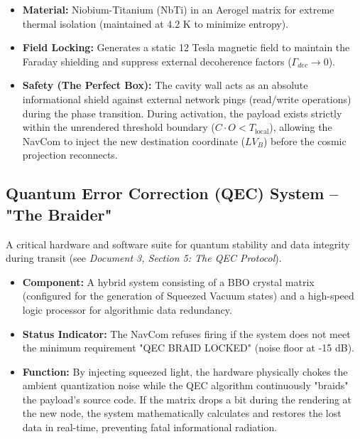 \documentclass[12pt,a4paper]{article}
\begin{document}
\begin{itemize}
    \item \textbf{Material:} Niobium-Titanium (NbTi) in an Aerogel matrix for extreme thermal isolation (maintained at 4.2 K to minimize entropy).
    \item \textbf{Field Locking:} Generates a static 12 Tesla magnetic field to maintain the Faraday shielding and suppress external decoherence factors ($\Gamma_{dec} \rightarrow 0$).
    \item \textbf{Safety (The Perfect Box):} The cavity wall acts as an absolute informational shield against external network pings (read/write operations) during the phase transition. During activation, the payload exists strictly within the unrendered threshold boundary ($C \cdot O < T_{\mathrm{local}}$), allowing the NavCom to inject the new destination coordinate ($LV_B$) before the cosmic projection reconnects.
\end{itemize}


\subsection{Quantum Error Correction (QEC) System -- "The Braider"}
A critical hardware and software suite for quantum stability and data integrity during transit (see \textit{Document 3, Section 5: The QEC Protocol}).
\begin{itemize}
    \item \textbf{Component:} A hybrid system consisting of a BBO crystal matrix (configured for the generation of Squeezed Vacuum states) and a high-speed logic processor for algorithmic data redundancy.
    \item \textbf{Status Indicator:} The NavCom refuses firing if the system does not meet the minimum requirement "QEC BRAID LOCKED" (noise floor at -15 dB). 
    \item \textbf{Function:} By injecting squeezed light, the hardware physically chokes the ambient quantization noise while the QEC algorithm continuously "braids" the payload's source code. If the matrix drops a bit during the rendering at the new node, the system mathematically calculates and restores the lost data in real-time, preventing fatal informational radiation.
\end{itemize}
\end{document}

